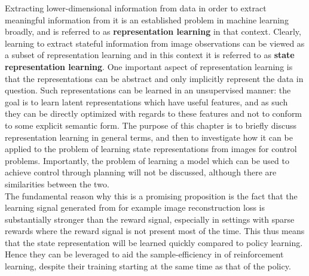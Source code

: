 Extracting lower-dimensional information from data in order to extract
meaningful information from it is an established problem in machine learning broadly,
and is referred to as \textbf{representation learning} in that context.
Clearly, learning to extract stateful information from image observations
can be viewed as a subset of representation learning
and in this context it is referred to as \textbf{state representation learning}.
One important aspect of representation learning is that the representations
can be abstract and only implicitly represent the data in question.
Such representations can be learned in an unsupervised manner:
the goal is to learn latent representations which have useful features,
and as such they can be directly optimized with regards to these features
and not to conform to some explicit semantic form.
The purpose of this chapter is to briefly discuss representation learning
in general terms, and then to investigate how it can be applied
to the problem of learning state representations from images for control problems. 
Importantly, the problem of learning a model 
which can be used to achieve control through planning will not be discussed,
although there are similarities between the two.\\

The fundamental reason why this is a promising proposition is
the fact that the learning signal generated from for example
image reconstruction loss is substantially stronger than the reward signal,
especially in settings with sparse rewards where the reward signal is 
not present most of the time.
This thus means that the state representation will be learned quickly
compared to policy learning. Hence they can be leveraged to
aid the sample-efficiency in of reinforcement learning, 
despite their training starting at the same time as that of the policy.

